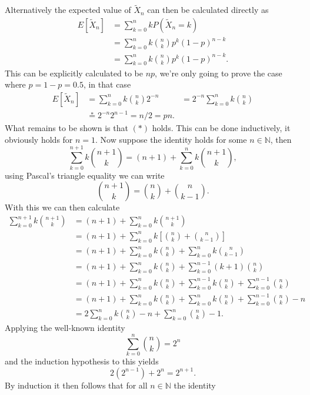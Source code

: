 \documentclass{article}
\begin{document}
\begin{enumerate}
\begin{itemize}
			Alternatively the expected value of $\tilde{X}_n$ can then be calculated directly as
			$$
			\begin{aligned}
			E[\tilde{X}_n] &= \sum_{k = 0}^n kP(\tilde{X}_n = k) \\
			&= \sum_{k = 0}^n k \binom{n}{k} p^k (1 - p)^{n - k} \\
			&= \sum_{k = 0}^n k \binom{n}{k} p^k (1 - p)^{n - k}.
			\end{aligned}
			$$
			This can be explicitly calculated to be $np$, we're only going to prove the case where $p = 1 - p = 0.5$, in that case
			$$
			\begin{aligned}
			E[\tilde{X}_n] &= \sum_{k = 0}^n k \binom{n}{k} 2^{-n}
			&= 2^{-n} \sum_{k = 0}^n k \binom{n}{k} \\
			&\overset{*}{=} 2^{-n} 2^{n - 1} = n / 2 = pn.
			\end{aligned}
			$$
			What remains to be shown is that $(*)$ holds. This can be done inductively, it obviously holds for $n = 1$. Now suppose the identity holds for some $n \in \mathbb{N}$, then
			$$
			\sum_{k = 0}^{n + 1} k \binom{n + 1}{k} = (n + 1) + \sum_{k = 0}^n k \binom{n + 1}{k},
			$$
			using Pascal's triangle equality we can write
			$$
			\binom{n + 1}{k} = \binom{n}{k} + \binom{n}{k - 1}.
			$$
			With this we can then calculate
			$$
			\begin{aligned}
			\sum_{k = 0}^{n + 1} k \binom{n + 1}{k} &= (n + 1) + \sum_{k = 0}^n k \binom{n + 1}{k} \\
			&= (n + 1) + \sum_{k = 0}^n k \left[ \binom{n}{k} + \binom{n}{k - 1} \right] \\
			&= (n + 1) + \sum_{k = 0}^n k \binom{n}{k} + \sum_{k = 0}^n k \binom{n}{k - 1} \\
			&= (n + 1) + \sum_{k = 0}^n k \binom{n}{k} + \sum_{k = 0}^{n - 1} (k + 1) \binom{n}{k} \\
			&= (n + 1) + \sum_{k = 0}^n k \binom{n}{k} + \sum_{k = 0}^{n - 1} k \binom{n}{k} + \sum_{k = 0}^{n - 1} \binom{n}{k} \\
			&= (n + 1) + \sum_{k = 0}^n k \binom{n}{k} + \sum_{k = 0}^n k \binom{n}{k} + \sum_{k = 0}^{n - 1} \binom{n}{k} - n \\
			&= 2 \sum_{k = 0}^n k \binom{n}{k} - n + \sum_{k = 0}^n \binom{n}{k} - 1.
			\end{aligned}
			$$
			Applying the well-known identity
			$$
			\sum_{k = 0}^n \binom{n}{k} = 2^n
			$$
			and the induction hypothesis to this yields
			$$
			2 (2^{n - 1}) + 2^n = 2^{n + 1}.
			$$
			By induction it then follows that for all $n \in \mathbb{N}$ the identity

\end{itemize}
\end{enumerate}
\end{document}
